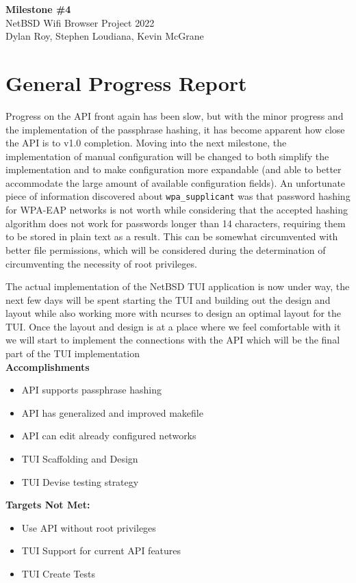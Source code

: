 \documentclass[11pt]{article}
\begin{document}
\begin{center}
  \textbf{\Large Milestone \#4}\\\large NetBSD Wifi Browser Project 2022\\
  Dylan Roy, Stephen Loudiana, Kevin McGrane
\end{center}


\section{General Progress Report}
Progress on the API front again has been slow, but with the minor progress
and the implementation of the passphrase hashing, it has become apparent
how close the API is to v1.0 completion. Moving into the next milestone, 
the implementation of manual configuration will be changed to both simplify
the implementation and to make configuration more expandable (and able to
better accommodate the large amount of available configuration fields). An
unfortunate piece of information discovered about \texttt{wpa\_supplicant}
was that password hashing for WPA-EAP networks is not worth while considering
that the accepted hashing algorithm does not work for passwords longer than
14 characters, requiring them to be stored in plain text as a result. This
can be somewhat circumvented with better file permissions, which will be considered
during the determination of circumventing the necessity of root privileges. 

The actual implementation of the NetBSD TUI application is now under way, the next 
few days will be spent starting the TUI and building out the design and layout while
also working more with ncurses to design an optimal layout for the TUI. Once the 
layout and design is at a place where we feel comfortable with it we will start 
to implement the connections with the API which will be the final part of the 
TUI implementation\\

\textbf{Accomplishments}
\begin{itemize}
  \item API supports passphrase hashing
  \item API has generalized and improved makefile
  \item API can edit already configured networks
  \item TUI Scaffolding and Design
  \item TUI Devise testing strategy
\end{itemize}

\textbf{Targets Not Met:}
\begin{itemize}
  \item Use API without root privileges
  \item TUI Support for current API features
  \item TUI Create Tests
\end{itemize}
\end{document}
